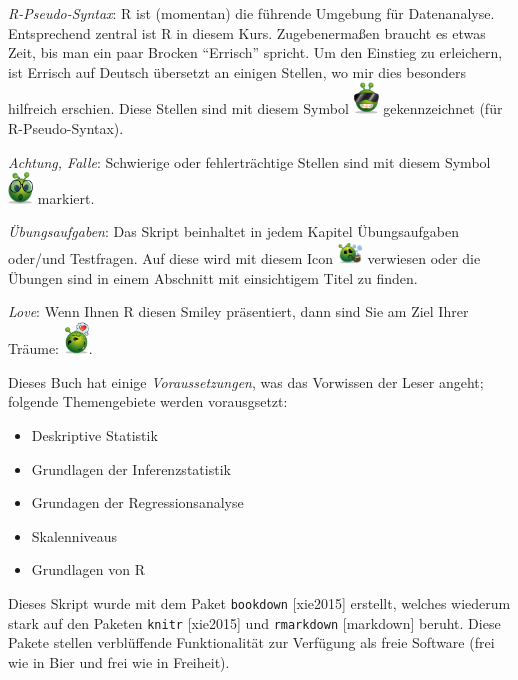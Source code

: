 \documentclass[12pt,ngerman,]{book}
\providecommand{\tightlist}{%
  \setlength{\itemsep}{0pt}\setlength{\parskip}{0pt}}
\begin{document}
\emph{R-Pseudo-Syntax}: R ist (momentan) die führende Umgebung für
Datenanalyse. Entsprechend zentral ist R in diesem Kurs. Zugebenermaßen
braucht es etwas Zeit, bis man ein paar Brocken ``Errisch'' spricht. Um
den Einstieg zu erleichern, ist Errisch auf Deutsch übersetzt an einigen
Stellen, wo mir dies besonders hilfreich erschien. Diese Stellen sind
mit diesem Symbol
\includegraphics[width=0.05000\textwidth]{images/pseudocode.png}
gekennzeichnet (für R-Pseudo-Syntax).

\emph{Achtung, Falle}: Schwierige oder fehlerträchtige Stellen sind mit
diesem Symbol
\includegraphics[width=0.05000\textwidth]{images/caution.png} markiert.

\emph{Übungsaufgaben}: Das Skript beinhaltet in jedem Kapitel
Übungsaufgaben oder/und Testfragen. Auf diese wird mit diesem Icon
\includegraphics[width=0.05000\textwidth]{images/exercises.png}
verwiesen oder die Übungen sind in einem Abschnitt mit einsichtigem
Titel zu finden.

\emph{Love}: Wenn Ihnen R diesen Smiley präsentiert, dann sind Sie am
Ziel Ihrer Träume:
\includegraphics[width=0.05000\textwidth]{images/love.png}.

Dieses Buch hat einige \emph{Voraussetzungen}, was das Vorwissen der
Leser angeht; folgende Themengebiete werden vorausgsetzt:

\begin{itemize}
\tightlist
\item
  Deskriptive Statistik
\item
  Grundlagen der Inferenzstatistik
\item
  Grundagen der Regressionsanalyse
\item
  Skalenniveaus
\item
  Grundlagen von R
\end{itemize}

Dieses Skript wurde mit dem Paket \texttt{bookdown} {[}xie2015{]}
erstellt, welches wiederum stark auf den Paketen \texttt{knitr}
{[}xie2015{]} und \texttt{rmarkdown} {[}markdown{]} beruht. Diese Pakete
stellen verblüffende Funktionalität zur Verfügung als freie Software
(frei wie in Bier und frei wie in Freiheit).
\end{document}

